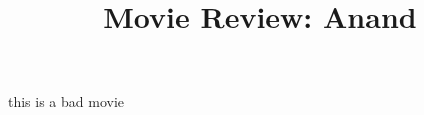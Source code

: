 \documentclass[12pt, a4paper]{article}
\title{Movie Review: Anand}
\author{}
\date{}
\begin{document}
\maketitle
this is a bad movie \\
\end{document}
